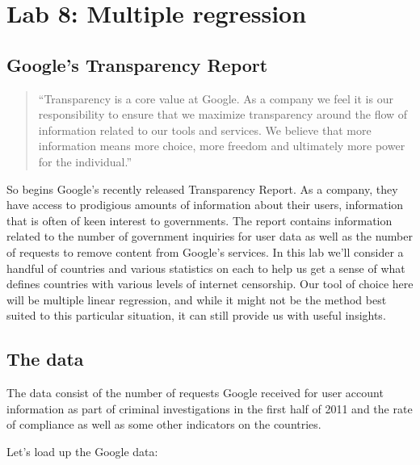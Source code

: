 \documentclass[11pt]{article}
\begin{document}
\section*{Lab 8: Multiple regression}


\subsection*{Google's Transparency Report}
\begin{quote}
``Transparency is a core value at Google. As a company we feel it is our responsibility to ensure that we maximize transparency around the flow of information related to our tools and services. We believe that more information means more choice, more freedom and ultimately more power for the individual.''
\end{quote}

So begins Google's recently released Transparency Report.  As a company, they have access to prodigious amounts of information about their users, information that is often of keen interest to governments.  The report contains information related to the number of government inquiries for user data as well as the number of requests to remove content from Google's services. In this lab we'll consider a handful of countries and various statistics on each to help us get a sense of what defines countries with various levels of internet censorship.  Our tool of choice here will be multiple linear regression, and while it might not be the method best suited to this particular situation, it can still provide us with useful insights.

\subsection*{The data}

The data consist of the number of requests Google received for user account information as part of criminal investigations in the first half of 2011 and the rate of compliance as well as some other indicators on the countries.

Let's load up the Google data:

\ttfamily\noindent
\hlstd{}\hspace*{\fill}\\
\hlassignement{\usebox{\hlnormalsizeboxlessthan}-}{\ }\hlkeyword{(}\hlkeyword{)}\hspace*{\fill}\\
\normalfont
\end{document}
